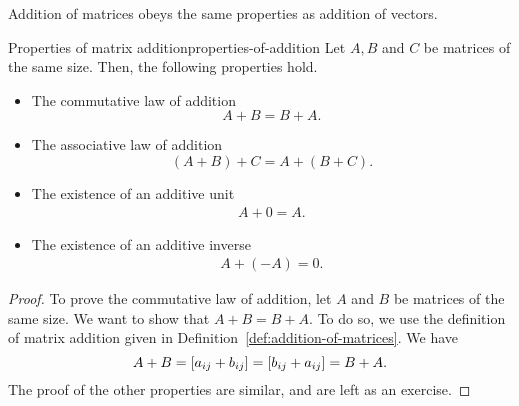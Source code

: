 Addition of matrices obeys the same properties as addition of vectors.

\begin{theorem}{Properties of matrix addition}{properties-of-addition}
  Let $A,B$ and $C$ be matrices of the same size. Then, the following
  properties%
   hold.

  \begin{itemize}
  \item The commutative law of addition
    \begin{equation*}
      A+B=B+A.
    \end{equation*}
  \item The associative law of addition
    \begin{equation*}
      (A+B)+C=A+(B+C).
    \end{equation*}
  \item The existence of an additive unit
    \begin{equation*}
      \begin{array}{c}
        A+0=A.
      \end{array}
    \end{equation*}
  \item The existence of an additive inverse
    \begin{equation*}
      \begin{array}{c}
        A+(-A) = 0.
      \end{array}
    \end{equation*}
  \end{itemize}
\end{theorem}

\begin{proof}
  To prove the commutative law of addition, let $A$ and $B$ be
  matrices of the same size. We want to show that $A+B=B+A$. To do so,
  we use the definition of matrix addition given in Definition~\ref{def:addition-of-matrices}.  We have
  \begin{equation*}
    A+B = \left[a_{ij}+b_{ij}\right] = \left[b_{ij}+a_{ij}\right] = B+A.
  \end{equation*}
  The proof of the other properties are similar, and are left as an
  exercise.
\end{proof}
